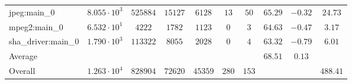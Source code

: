 \begin{tabular}{|l|c|c|c|c|c|c|c|c|c|}
jpeg:main\_0            & $ 8.055 \cdot 10^{3} $ & $ 525884 $ & $ 15127 $ & $ 6128  $ & $ 13  $ & $ 50  $ & $ 65.29       $ & $ -0.32   $ & $ 24.73   $ \\
mpeg2:main\_0           & $ 6.532 \cdot 10^{1} $ & $ 4222   $ & $ 1782  $ & $ 1123  $ & $ 0   $ & $ 3   $ & $ 64.63       $ & $ -0.47   $ & $ 3.17    $ \\
sha\_driver:main\_0     & $ 1.790 \cdot 10^{3} $ & $ 113322 $ & $ 8055  $ & $ 2028  $ & $ 0   $ & $ 4   $ & $ 63.32       $ & $ -0.79   $ & $ 6.01    $ \\
\hline
Average                 & $                    $ & $        $ & $       $ & $       $ & $     $ & $     $ & $ 68.51       $ & $ 0.13    $ & $         $ \\
\hline
Overall                 & $ 1.263 \cdot 10^{4} $ & $ 828904 $ & $ 72620 $ & $ 45359 $ & $ 280 $ & $ 153 $ & $             $ & $         $ & $ 488.41  $ \\
\hline
\end{tabular}
